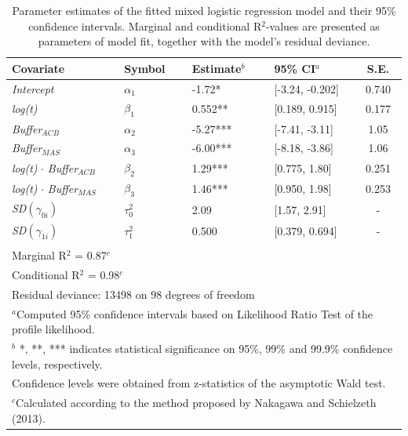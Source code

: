 \begin{table}[H]
	\centering
	\caption{Parameter estimates of the fitted mixed logistic regression model and their 95\% confidence intervals. Marginal and conditional R$^{2}$-values are presented as parameters of model fit, together with the model's residual deviance.}
	\label{tb:regression_table}
	\begin{tabular}{llllc}
        \toprule
	\textbf{Covariate} & \textbf{Symbol} & \textbf{Estimate$^{b}$} & \textbf{95\% CI$^{a}$} & \textbf{S.E.}\\
		\midrule
  \emph{Intercept}                          & $\alpha_1$ & -1.72*     & [-3.24, -0.202] & 0.740 \\
  \emph{log(t)}                             & $\beta_1$  & 0.552**    & [0.189, 0.915]  & 0.177 \\
  \emph{Buffer$_{ACB}$}                     & $\alpha_2$ & -5.27***   & [-7.41, -3.11]  & 1.05  \\
  \emph{Buffer$_{MAS}$}                     & $\alpha_3$ & -6.00***   & [-8.18, -3.86]  & 1.06  \\
  \emph{log(t)} $\cdot$ \emph{Buffer$_{ACB}$} & $\beta_2$& 1.29***    & [0.775, 1.80]   & 0.251 \\
  \emph{log(t)} $\cdot$ \emph{Buffer$_{MAS}$} & $\beta_3$& 1.46***    & [0.950, 1.98]   & 0.253 \\
  \emph{SD}$(\gamma_{0i})$                  & $\tau_0^2$ & 2.09       & [1.57, 2.91]    & -     \\
  \emph{SD}$(\gamma_{1i})$                  & $\tau_1^2$ & 0.500      & [0.379, 0.694]  & -     \\
  &&& \\
  \multicolumn{5}{l}{Marginal R$^{2}$ = 0.87$^{c}$} \\
  \multicolumn{5}{l}{Conditional R$^{2}$ = 0.98$^{c}$} \\
  \multicolumn{5}{l}{Residual deviance: 13498 on 98 degrees of freedom} \\
		\bottomrule
  \multicolumn{5}{l}{\footnotesize $^{a}$Computed 95\% confidence intervals based on Likelihood Ratio Test of the profile likelihood.} \\
  \multicolumn{5}{l}{\footnotesize $^{b}$ *, **, *** indicates statistical significance on 95\%, 99\% and 99.9\% confidence levels, respectively.} \\
  \multicolumn{5}{l}{\footnotesize Confidence levels were obtained from z-statistics of the asymptotic Wald test.} \\
    \multicolumn{5}{l}{\footnotesize $^{c}$Calculated according to the method proposed by Nakagawa and Schielzeth (2013).} \\
	\end{tabular}
\end{table}

